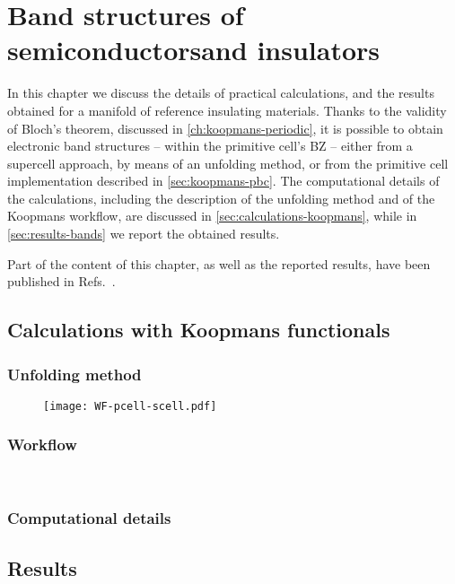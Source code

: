 \cleardoublepage
\chapter[Band structures of semiconductors and insulators]{Band structures of semiconductors\break and insulators\label{ch:band-structures}}
In this chapter we discuss the details of practical calculations, and the results obtained for a manifold of reference insulating materials. Thanks to the validity of Bloch's theorem, discussed in \cref{ch:koopmans-periodic}, it is possible to obtain electronic band structures -- within the primitive cell's BZ -- either from a supercell approach, by means of an unfolding method, or from the primitive cell implementation described in \cref{sec:koopmans-pbc}. The computational details of the calculations, including the description of the unfolding method and of the Koopmans workflow, are discussed in \cref{sec:calculations-koopmans}, while in \cref{sec:results-bands} we report the obtained results.

Part of the content of this chapter, as well as the reported results, have been published in Refs.~\cite{de_gennaro_blochs_2022,colonna_koopmans_2022}.

\cleardoublepage
\section{Calculations with Koopmans functionals\label{sec:calculations-koopmans}}


\subsection{Unfolding method\label{sec:unfolding-method}}

\begin{figure}
    \centering
    \texttt{[image: WF-pcell-scell.pdf]}
    \caption[]{}
    \label{fig:map-wf}
\end{figure}


\subsection{Workflow\label{sec:workflow}}

\begin{figure}
    \centering
     \\
    \caption[]{}
    \label{fig:workflow}
\end{figure}

\subsection{Computational details\label{sec:computational-details}}

\section{Results\label{sec:results-bands}}

